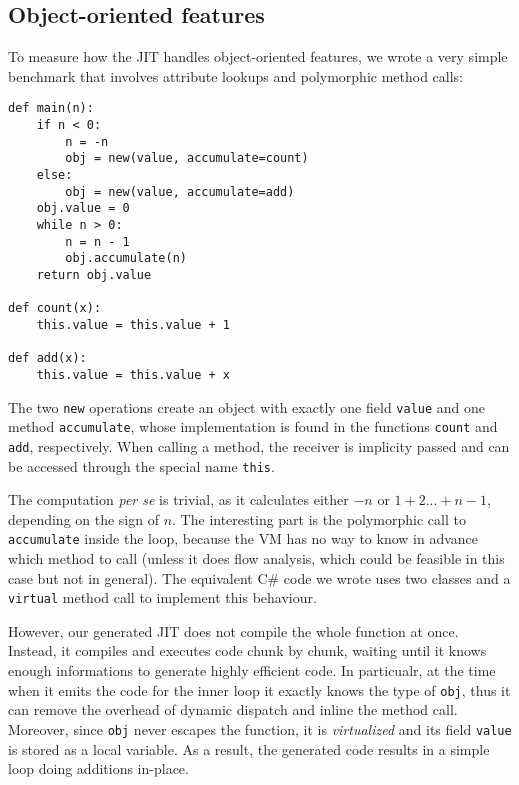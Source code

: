 \subsection{Object-oriented features}

To measure how the JIT handles object-oriented features, we wrote a very
simple benchmark that involves attribute lookups and polymorphic method calls:

\begin{lstlisting}
def main(n):
    if n < 0:
        n = -n
        obj = new(value, accumulate=count)
    else:
        obj = new(value, accumulate=add)
    obj.value = 0
    while n > 0:
        n = n - 1
        obj.accumulate(n)
    return obj.value

def count(x):
    this.value = this.value + 1

def add(x):
    this.value = this.value + x
\end{lstlisting}

The two \lstinline{new} operations create an object with exactly one field
\lstinline{value} and one method \lstinline{accumulate}, whose implementation
is found in the functions \lstinline{count} and \lstinline{add}, respectively.
When calling a method, the receiver is implicity passed and can be accessed
through the special name \lstinline{this}.

The computation \emph{per se} is trivial, as it calculates either $-n$ or
$1+2...+n-1$, depending on the sign of $n$. The interesting part is the
polymorphic call to \lstinline{accumulate} inside the loop, because the VM has
no way to know in advance which method to call (unless it does flow analysis,
which could be feasible in this case but not in general).  The equivalent C\#
code we wrote uses two classes and a \lstinline{virtual} method call to
implement this behaviour.

However, our generated JIT does not compile the whole function at
once. Instead, it compiles and executes code chunk by chunk, waiting until it
knows enough informations to generate highly efficient code.  In particualr,
at the time when it emits the code for the inner loop it exactly knows the
type of \lstinline{obj}, thus it can remove the overhead of dynamic dispatch
and inline the method call.  Moreover, since \lstinline{obj} never escapes the
function, it is \emph{virtualized} and its field \lstinline{value} is stored
as a local variable.  As a result, the generated code results in a simple loop
doing additions in-place.

